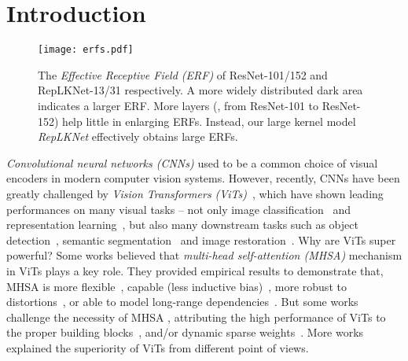 \documentclass[10pt,twocolumn,letterpaper]{article}
\begin{document}
\section{Introduction}
	\label{sec:intro}
	
	
	\begin{figure}[t]
		\begin{center}
			\texttt{[image: erfs.pdf]}
			\vspace{-0.25in}
			\caption{The \emph{Effective Receptive Field (ERF)} of ResNet-101/152 and RepLKNet-13/31 respectively. A more widely distributed dark area indicates a larger ERF. More layers (\eg, from ResNet-101 to ResNet-152) help little in enlarging ERFs. Instead, our large kernel model \emph{RepLKNet} effectively obtains large ERFs.}
			\label{fig-rf}
			\vspace{-0.35in}
		\end{center}
	\end{figure}	
	
	\emph{Convolutional neural networks (CNNs)} \cite{krizhevsky2012imagenet,he2016deep} used to be a common choice of visual encoders in modern computer vision systems. However, recently, CNNs \cite{krizhevsky2012imagenet,he2016deep} have been greatly challenged by \emph{Vision Transformers (ViTs)}~\cite{vit,swin,deit,pvt}, which have shown leading performances on many visual tasks -- not only image classification~\cite{vit,yuan2021volo} and representation learning~\cite{mocov3,dino,swinself,bao2021beit}, but also many downstream tasks such as object detection~\cite{swin,dai2021dynamic}, semantic segmentation~\cite{pvt,xie2021segformer} and image restoration~\cite{ipt,liang2021swinir}. 
	Why are ViTs super powerful? Some works believed that \emph{multi-head self-attention (MHSA)} mechanism in ViTs plays a key role. They provided empirical results to demonstrate that, MHSA is more flexible~\cite{clip}, capable (less inductive bias)~\cite{cordonnier2019relationship}, more robust to distortions~\cite{paul2021vision,xie2021segformer}, or able to model long-range dependencies~\cite{vaswani2017attention,raghu2021vision}. But some works challenge the necessity of MHSA \cite{zhu2019empirical}, attributing the high performance of ViTs to the proper building blocks~\cite{dong2021attention}, and/or dynamic sparse weights~\cite{han2021demystifying,zhao2021battle}. More works~\cite{hinton2021represent,zhu2019empirical,han2021demystifying,wu2019pay,cordonnier2019relationship} explained the superiority of ViTs from different point of views.
	
\end{document}
